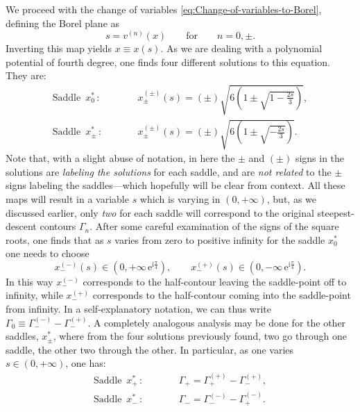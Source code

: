 \documentclass[11pt,a4paper]{article}
\newcommand{\rme}{{\mathrm{e}}}
\newcommand{\rmi}{{\mathrm{i}}}
\begin{document}
We proceed with the change of variables \eqref{eq:Change-of-variables-to-Borel}, defining the Borel plane as
%
\begin{equation}
s = v^{(n)} (x) \qquad \text{for} \qquad n=0,\pm.
\end{equation}
%
\noindent
Inverting this map yields $x \equiv x(s)$. As we are dealing with a polynomial potential of fourth degree, one finds four different solutions to this equation. They are:
%
\begin{eqnarray}
\text{Saddle }\, x_{0}^{*}\, : &\qquad& x_{\pm}^{(\pm)} (s) = (\pm) \sqrt{ 6 \left( 1 \pm \sqrt{1-\frac{2s}{3}} \right)}, \\
\text{Saddle }\, x_{\pm}^{*}\, : &\qquad& x_{\pm}^{(\pm)} (s) = (\pm) \sqrt{6 \left( 1 \pm \sqrt{-\frac{2s}{3}} \right)}.
\end{eqnarray}
%
\noindent
Note that, with a slight abuse of notation, in here the $\pm$ and $(\pm)$ signs in the solutions are \textit{labeling the solutions} for each saddle, and are \textit{not related} to the $\pm$ signs labeling the saddles---which hopefully will be clear from context. All these maps will result in a variable $s$ which is varying in $(0,+\infty)$, but, as we discussed earlier, only \textit{two} for each saddle will correspond to the original steepest-descent contours $\Gamma_n$. After some careful examination of the signs of the square roots, one finds that as $s$ varies from zero to positive infinity for the saddle $x_0^*$ one needs to choose
%
\begin{equation}
x_{-}^{(-)} (s) \in \left( 0, + \infty\, \rme^{\rmi \frac{\pi}{4}} \right), \qquad x_{-}^{(+)} (s) \in \left( 0, - \infty\, \rme^{\rmi \frac{\pi}{4}} \right).
\end{equation}
%
\noindent
In this way $x_{-}^{(-)}$ corresponds to the half-contour leaving the saddle-point off to infinity, while $x_{-}^{(+)}$ corresponds to the half-contour coming into the saddle-point from infinity. In a self-explanatory notation, we can thus write $\Gamma_{0} \equiv \Gamma_{-}^{(-)} - \Gamma_{-}^{(+)}$. A completely analogous analysis may be done for the other saddles, $x^*_{\pm}$, where from the four solutions previously found, two go through one saddle, the other two through the other. In particular, as one varies $s \in (0,+\infty)$, one has:
%
\begin{eqnarray}
\text{Saddle }\, x^*_+\, : &\qquad& \Gamma_+ = \Gamma_+^{(+)} - \Gamma_-^{(+)}, \\
\text{Saddle }\, x^*_-\, : &\qquad& \Gamma_- = \Gamma_-^{(-)} - \Gamma_+^{(-)}.
\end{eqnarray}
\end{document}
